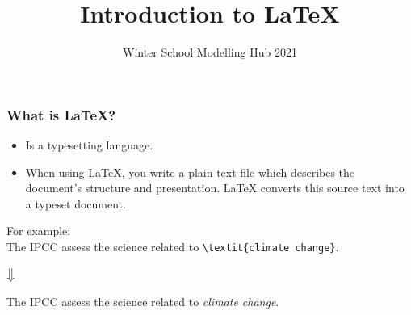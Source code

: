 \documentclass{beamer}
\title[Introduction to \LaTeX]{Introduction to \LaTeX} %
\subtitle{Winter School Modelling Hub 2021}
\institute[Antarctica Research Centre]{Victoria University of Wellington} %
\date{} %
\begin{document}
\begin{frame}
\titlepage %
\end{frame}





\begin{frame}[fragile]
\frametitle{What is \LaTeX?}
\begin{itemize}
\item Is a typesetting language. \\
\item When using \LaTeX, you write a plain text file which describes the document's structure and presentation. \LaTeX{} converts this source text into a typeset document. \\
\end{itemize}

For example: \\
\color{purple}
The IPCC assess the science related to \verb!\textit{climate change}!.\\ 
\color{black}
\begin{center}
	$\big\Downarrow$
\end{center}
\color{purple}
\begin{center}
The IPCC assess the science related to \textit{climate change}. \\
\end{center} 
 \end{frame} 
\end{document}
